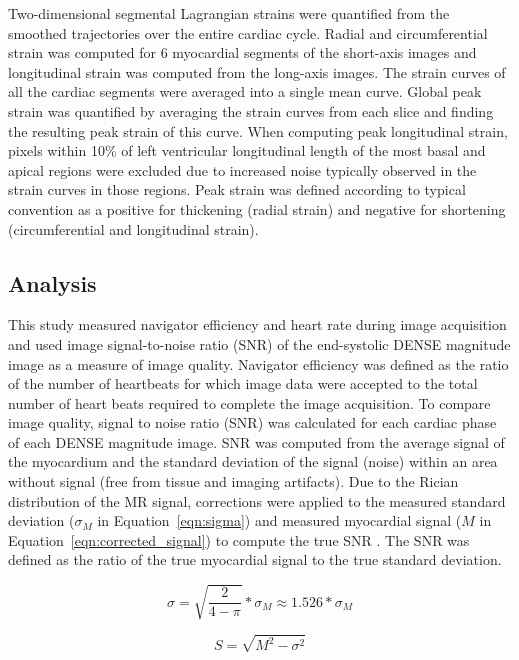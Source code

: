 	Two-dimensional segmental Lagrangian strains were quantified from the smoothed trajectories over the entire cardiac cycle. Radial and circumferential strain was computed for 6 myocardial segments of the short-axis images and longitudinal strain was computed from the long-axis images. The strain curves of all the cardiac segments were averaged into a single mean curve. Global peak strain was quantified by averaging the strain curves from each slice and finding the resulting peak strain of this curve. When computing peak longitudinal strain, pixels within 10\% of left ventricular longitudinal length of the most basal and apical regions were excluded due to increased noise typically observed in the strain curves in those regions. Peak strain was defined according to typical convention as a positive for thickening (radial strain) and negative for shortening (circumferential and longitudinal strain).

\subsection{Analysis}
	This study measured navigator efficiency and heart rate during image acquisition and used image signal-to-noise ratio (SNR) of the end-systolic DENSE magnitude image as a measure of image quality. Navigator efficiency was defined as the ratio of the number of heartbeats for which image data were accepted to the total number of heart beats required to complete the image acquisition. To compare image quality, signal to noise ratio (SNR) was calculated for each cardiac phase of each DENSE magnitude image. SNR was computed from the average signal of the myocardium and the standard deviation of the signal (noise) within an area without signal (free from tissue and imaging artifacts). Due to the Rician distribution of the MR signal, corrections were applied to the measured standard deviation ($\sigma_M$ in Equation~\ref{eqn:sigma}) and measured myocardial signal ($M$ in Equation~\ref{eqn:corrected_signal}) to compute the true SNR \cite{Wehner2015,Wehner2015a,Gudbjartsson1995}. The SNR was defined as the ratio of the true myocardial signal to the true standard deviation.

\begin{equation}
	\label{eqn:sigma}
	\sigma = \sqrt{\frac{2}{4-\pi}}*\sigma_M \approx 1.526*\sigma_M
\end{equation}

\begin{equation}
	\label{eqn:corrected_signal}
	S= \sqrt{M^2-\sigma^2}
\end{equation}

